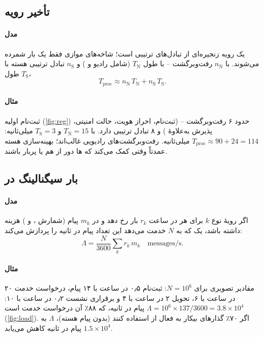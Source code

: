 \documentclass[11pt,a4paper]{article}
\begin{document}
\subsection{تأخیر رویه}\label{sec:lat}
\paragraph{مدل} یک رویه زنجیره‌ای از تبادل‌های ترتیبی است؛ شاخه‌های موازی فقط یک بار شمرده می‌شوند. با $n_{\mathrm{N}}$ رفت‌وبرگشت
-- با طول $T_{\mathrm{N}}$ (شامل رادیو و ) و $n_{\mathrm{S}}$ تبادل ترتیبی هسته با طول $T_{\mathrm{S}}$،
\begin{equation}\label{eq:latency}
  T_{\mathrm{proc}} \approx n_{\mathrm{N}}\,T_{\mathrm{N}} + n_{\mathrm{S}}\,T_{\mathrm{S}} .
\end{equation}
\paragraph{مثال} ثبت‌نام اولیه (\cref{fig:reg}) حدود ۶ رفت‌وبرگشت -- (ثبت‌نام، احراز هویت، حالت امنیتی، پذیرش
به‌علاوهٔ ) و ۸ تبادل ترتیبی  دارد. با $T_{\mathrm{N}} = 15$ و $T_{\mathrm{S}} = 3$ میلی‌ثانیه:
$T_{\mathrm{proc}} \approx 90 + 24 = 114$ میلی‌ثانیه. رفت‌وبرگشت‌های رادیویی غالب‌اند؛ بهینه‌سازی هسته عمدتاً وقتی کمک می‌کند که
ها دور از هم یا پربار باشند.

\subsection{بار سیگنالینگ در }\label{sec:load}
\paragraph{مدل} اگر رویهٔ نوع $k$ برای هر  در ساعت $r_k$ بار رخ دهد و در  $m_k$ پیام (شمارش ، 
و ) هزینه داشته باشد، یک  که به $N$  خدمت می‌دهد این تعداد پیام در ثانیه را پردازش می‌کند:
\begin{equation}\label{eq:load}
  \Lambda = \frac{N}{3600}\sum_k r_k\, m_k \quad \text{messages/s}.
\end{equation}
\paragraph{مثال} مقادیر تصویری برای $N = 10^6$: ثبت‌نام ۰٫۵ در ساعت با ۱۴ پیام، درخواست خدمت ۲۰ در ساعت با ۶، تحویل  ۲ در ساعت
با ۴ و برقراری نشست  ۰٫۲ در ساعت با ۱۰: $\Lambda = 10^6\times137/3600 = 3.8\times10^4$ پیام در ثانیه، که ۸۸٪ آن
درخواست خدمت است (\cref{fig:load}). اگر ۷۰٪ گذارهای بیکار به فعال از  استفاده کنند (بدون پیام هسته)، $\Lambda$ به
$1.5\times10^4$ پیام در ثانیه کاهش می‌یابد.
\end{document}
